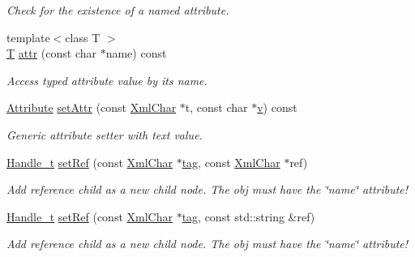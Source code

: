 \begin{DoxyCompactItemize}
\begin{DoxyCompactList}\small\item\em Check for the existence of a named attribute. \end{DoxyCompactList}\item 
{\footnotesize template$<$class T $>$ }\\\hyperlink{class_t}{T} \hyperlink{class_d_d4hep_1_1_x_m_l_1_1_handle__t_af4044883cf0359ae3819a51ec029ef66}{attr} (const char $\ast$name) const
\begin{DoxyCompactList}\small\item\em Access typed attribute value by it\textquotesingle{}s name. \end{DoxyCompactList}\item 
\hyperlink{namespace_d_d4hep_1_1_x_m_l_a5c19b7116be99d69b4b22d911357baaf}{Attribute} \hyperlink{class_d_d4hep_1_1_x_m_l_1_1_handle__t_af35532294e70e0f186185ab745b17204}{set\+Attr} (const \hyperlink{namespace_d_d4hep_1_1_x_m_l_a09e5d9cc86ed782f6826dfe0778c1815}{Xml\+Char} $\ast$t, const char $\ast$\hyperlink{_multi_view_8cpp_a8320ee13ac034dbf6d624fe8953dd337}{v}) const
\begin{DoxyCompactList}\small\item\em Generic attribute setter with text value. \end{DoxyCompactList}\item 
\hyperlink{class_d_d4hep_1_1_x_m_l_1_1_handle__t}{Handle\+\_\+t} \hyperlink{class_d_d4hep_1_1_x_m_l_1_1_handle__t_a2906b635e870e0f88f60ca39c575bceb}{set\+Ref} (const \hyperlink{namespace_d_d4hep_1_1_x_m_l_a09e5d9cc86ed782f6826dfe0778c1815}{Xml\+Char} $\ast$\hyperlink{class_d_d4hep_1_1_x_m_l_1_1_handle__t_ac935379eb28cd33bc36f19c68da66143}{tag}, const \hyperlink{namespace_d_d4hep_1_1_x_m_l_a09e5d9cc86ed782f6826dfe0778c1815}{Xml\+Char} $\ast$ref)
\begin{DoxyCompactList}\small\item\em Add reference child as a new child node. The obj must have the \char`\"{}name\char`\"{} attribute! \end{DoxyCompactList}\item 
\hyperlink{class_d_d4hep_1_1_x_m_l_1_1_handle__t}{Handle\+\_\+t} \hyperlink{class_d_d4hep_1_1_x_m_l_1_1_handle__t_ae9a7b050148f90e4df3021b555bf7f3b}{set\+Ref} (const \hyperlink{namespace_d_d4hep_1_1_x_m_l_a09e5d9cc86ed782f6826dfe0778c1815}{Xml\+Char} $\ast$\hyperlink{class_d_d4hep_1_1_x_m_l_1_1_handle__t_ac935379eb28cd33bc36f19c68da66143}{tag}, const std\+::string \&ref)
\begin{DoxyCompactList}\small\item\em Add reference child as a new child node. The obj must have the \char`\"{}name\char`\"{} attribute! \end{DoxyCompactList}\item 

\end{DoxyCompactItemize}
